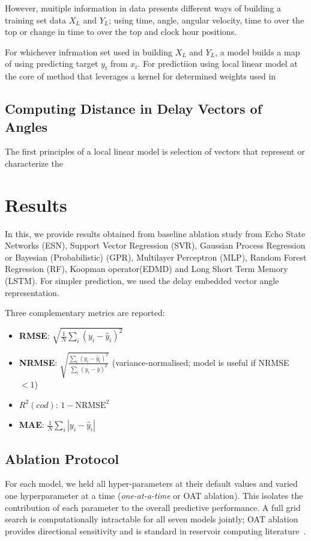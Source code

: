 \documentclass[letterpaper, 10pt, conference]{IEEEtran}
\begin{document}
            However, muitiple information in data presents different ways of building a training set data $X_L$ and $Y_L$; using  time, angle, angular velocity, time to over the top or change in time to over the top and clock hour positions.

            For whichever infrmation set used in building $X_L$  and $Y_L$, a model builds a map of using predicting target $y_t$ from $x_t$. For predictiion using local linear model at the core of method that leverages a kernel for determined weights used in 

             \subsection{Computing Distance in Delay Vectors of Angles}
                The first principles of a local linear model is selection of vectors that represent or characterize the 

            
       



    \section{Results}
        In this, we provide results obtained from baseline ablation study from  Echo State Networks (ESN), Support Vector Regression (SVR), Gaussian Process Regression or Bayesian (Probabilistic) (GPR), Multilayer Perceptron (MLP), Random Forest Regression (RF), Koopman operator(EDMD) and Long Short Term Memory (LSTM). For simpler prediction, we used the delay embedded vector angle representation.

        Three complementary metrics are reported:
            \begin{itemize}
              \item \textbf{RMSE}: $\sqrt{\frac{1}{N}\sum_i(y_i - \hat{y}_i)^2}$
              \item \textbf{NRMSE}: $\sqrt{\frac{\sum_i(y_i - \hat{y}_i)^2}{\sum_i(y_i - \bar{y})^2}}$
                      (variance-normalised; model is useful if NRMSE~$<1$)
              \item \textbf{{$R^2 (cod)$}}: $1 - \mathrm{NRMSE}^2$
              \item \textbf{MAE}: $\frac{1}{N}\sum_i|y_i - \hat{y}_i|$
            \end{itemize}

        \subsection{Ablation Protocol}
            For each model, we held all hyper-parameters at their default values
            and varied one hyperparameter at a time (\emph{one-at-a-time} or OAT
            ablation). This isolates the contribution of each parameter to the
            overall predictive performance. A full grid search is computationally
            intractable for all seven models jointly; OAT ablation provides directional
            sensitivity and is standard in reservoir computing
            literature~\cite{lukosevicius_reservoir_2009}.
        
\end{document}
